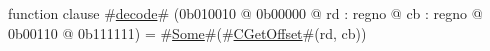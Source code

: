 function clause #\hyperref[zdecode]{decode}# (0b010010 @ 0b00000 @ rd : regno @ cb : regno @    0b00110 @ 0b111111) = #\hyperref[zSome]{Some}#(#\hyperref[zCGetOffset]{CGetOffset}#(rd, cb))
